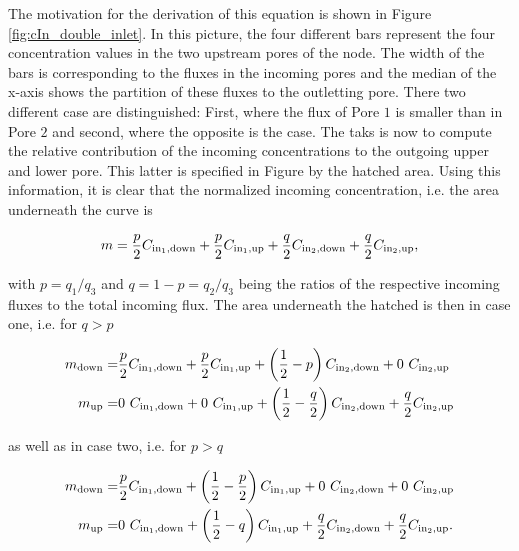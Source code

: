\documentclass[12pt]{report}
\begin{document}
The motivation for the derivation of this equation is shown in Figure \ref{fig:cIn_double_inlet}. In this picture, the four different bars represent the four concentration values in the two upstream pores of the node. The width of the bars is corresponding to the fluxes in the incoming pores and the median of the x-axis shows the partition of these fluxes to the outletting pore. There two different case are distinguished: First, where the flux of Pore $1$ is smaller than in Pore $2$ and second, where the opposite is the case. The taks is now to compute the relative contribution of the incoming concentrations to the outgoing upper and lower pore. This latter is specified in Figure by the hatched area. Using this information, it is clear that the normalized incoming concentration, i.e. the area underneath the curve is 

$$
	m = \frac{p}{2} C_{\rm{in_1, down}} + \frac{p}{2} C_{\rm{in_1, up}} + \frac{q}{2} C_{\rm{in_2, down}} + \frac{q}{2} C_{\rm{in_2, up}},
$$

with $p = q_1/q_3$ and $q = 1 - p = q_2/q_3$ being the ratios of the respective incoming fluxes to the total incoming flux. The area underneath the hatched is then in case one, i.e. for $q > p$

\begin{subequations}
\begin{align}
	m_{\rm{down}} = & \frac{p}{2} C_{\rm{in_1, down}} + \frac{p}{2} C_{\rm{in_1, up}} + \left(\frac12 - p \right) C_{\rm{in_2, down}} + 0\ C_{\rm{in_2, up}} \\
	m_{\rm{up}}   = & 0\ C_{\rm{in_1, down}} + 0\ C_{\rm{in_1, up}} + \left(\frac12 - \frac{q}{2} \right) C_{\rm{in_2, down}} + \frac{q}{2} C_{\rm{in_2, up}}
\end{align}
\end{subequations}

as well as in case two,  i.e. for $p > q$

\begin{subequations}
\begin{align}
	m_{\rm{down}} = & \frac{p}{2} C_{\rm{in_1, down}} + \left(\frac12 - \frac{p}{2} \right) C_{\rm{in_1, up}} + 0\ C_{\rm{in_2, down}} + 0\ C_{\rm{in_2, up}} \\
	m_{\rm{up}}   = & 0\ C_{\rm{in_1, down}} +  \left(\frac12 - q \right) C_{\rm{in_1, up}} + \frac{q}{2} C_{\rm{in_2, down}} + \frac{q}{2} C_{\rm{in_2, up}}.  
\end{align}
\end{subequations}
\end{document}

